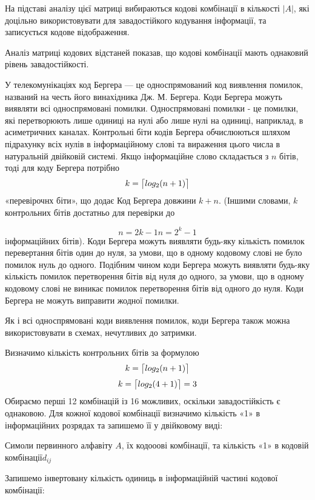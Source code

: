 \documentclass[a4paper,14pt]{extreport}
\DeclarePairedDelimiter{\ceil}{\lceil}{\rceil}
\begin{document}
На підставі аналізу цієї матриці вибираються кодові комбінації в кількості $|A|$, які
доцільно використовувати для завадостійкого кодування
інформації, та записується кодове відображення.

Аналіз матриці кодових відстаней показав, що кодові комбінації мають однаковий рівень завадостійкості.

У телекомунікаціях код Бергера — це односпрямований код виявлення помилок, названий на честь його винахідника Дж. М. Бергера. Коди Бергера можуть виявляти всі односпрямовані помилки. Односпрямовані помилки - це помилки, які перетворюють лише одиниці на нулі або лише нулі на одиниці, наприклад, в асиметричних каналах. Контрольні біти кодів Бергера обчислюються шляхом підрахунку всіх нулів в інформаційному слові та вираження цього числа в натуральній двійковій системі. Якщо інформаційне слово складається з $n$ бітів, тоді для коду Бергера потрібно 
$$k = \ceil[\big]{log_2 ( n + 1 )} $$  «перевірочнх біти», що додає Код Бергера довжини $k+n$. (Іншими словами,  $k$ контрольних бітів достатньо для перевірки до

 $$ n = 2 k - 1 n=2^{k}-1$$ 
інформаційних бітів). Коди Бергера можуть виявляти будь-яку кількість помилок перевертання бітів один до нуля, за умови, що в одному кодовому слові не було помилок нуль до одного. Подібним чином коди Бергера можуть виявляти будь-яку кількість помилок перетворення бітів від нуля до одного, за умови, що в одному кодовому слові не виникає помилок перетворення бітів від одного до нуля. Коди Бергера не можуть виправити жодної помилки.

Як і всі односпрямовані коди виявлення помилок, коди Бергера також можна використовувати в схемах, нечутливих до затримки.

Визначимо кількість контрольних бітів за формулою 
$$k = \ceil[\big]{log_2 ( n + 1 )} $$ 
$$k = \ceil[\big]{log_2 ( 4 + 1 )} = 3  $$ 
Обираємо перші 12 комбінацій із 16 можливих, оскільки завадостійкість є однаковою.  Для кожної кодової комбінації визначимо
кількість «1» в інформаційних розрядах та
запишемо її у двійковому виді:
\begin{table}[H]
	\caption{Симоли первинного алфавіту $A$, їх кодооові комбінації, та кількість «1» в кодовій комбінації$d_{ij}$}
	\centering
	
	\label{table:codewords-control_bits}
\end{table}

Запишемо інвертовану кількість одиниць в
інформаційній частині кодової комбінації:
\end{document}
